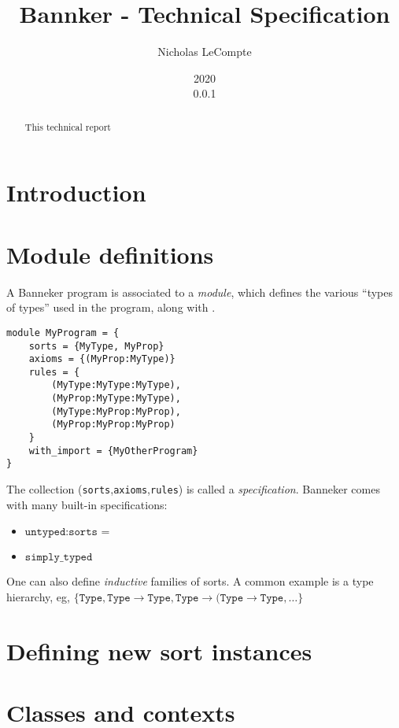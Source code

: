 \documentclass{report}
\def\version{0.0.1}
\begin{document}
\title{Bannker - Technical Specification}
\author{Nicholas LeCompte}
\date{2020 \\ \version}
\maketitle

\begin{abstract}
    This technical report 
\end{abstract}

\chapter{Introduction}

\chapter{Module definitions}

A Banneker program is associated to a \emph{module}, which defines the various ``types of types'' used in the program, along with .
\begin{verbatim}
module MyProgram = {
    sorts = {MyType, MyProp}
    axioms = {(MyProp:MyType)}
    rules = {
        (MyType:MyType:MyType),
        (MyProp:MyType:MyType),
        (MyType:MyProp:MyProp),
        (MyProp:MyProp:MyProp)
    }
    with_import = {MyOtherProgram}
}
\end{verbatim}

The collection (\texttt{sorts},\texttt{axioms},\texttt{rules}) is called a \emph{specification}. Banneker comes with many built-in specifications:
\begin{itemize}
    \item $\texttt{untyped}: \texttt{sorts = }$
    \item $\texttt{simply\_typed}$
\end{itemize}

One can also define \emph{inductive} families of sorts. A common example is a type hierarchy, eg, $\{\texttt{Type},\texttt{Type} \rightarrow \texttt{Type},\texttt{Type} \rightarrow (\texttt{Type} \rightarrow \texttt{Type}, \ldots \}$

\chapter{Defining new sort instances}

\chapter{Classes and contexts}
\end{document}
